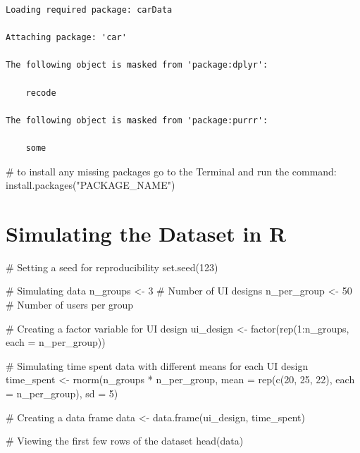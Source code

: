 \documentclass[
  letterpaper,
  DIV=11,
  numbers=noendperiod]{scrreprt}
\newenvironment{Shaded}{\begin{snugshade}}{\end{snugshade}}
\newcommand{\AttributeTok}[1]{\textcolor[rgb]{0.40,0.45,0.13}{#1}}
\newcommand{\CommentTok}[1]{\textcolor[rgb]{0.37,0.37,0.37}{#1}}
\newcommand{\DecValTok}[1]{\textcolor[rgb]{0.68,0.00,0.00}{#1}}
\newcommand{\FunctionTok}[1]{\textcolor[rgb]{0.28,0.35,0.67}{#1}}
\newcommand{\NormalTok}[1]{\textcolor[rgb]{0.00,0.23,0.31}{#1}}
\newcommand{\OtherTok}[1]{\textcolor[rgb]{0.00,0.23,0.31}{#1}}
\newcommand{\SpecialCharTok}[1]{\textcolor[rgb]{0.37,0.37,0.37}{#1}}
\begin{document}
\begin{verbatim}
Loading required package: carData

Attaching package: 'car'

The following object is masked from 'package:dplyr':

    recode

The following object is masked from 'package:purrr':

    some
\end{verbatim}

\begin{Shaded}
\begin{Highlighting}[]
\CommentTok{\# to install any missing packages go to the Terminal and run the command: install.packages("PACKAGE\_NAME")}
\end{Highlighting}
\end{Shaded}

\section{Simulating the Dataset in R}\label{simulating-the-dataset-in-r}

\begin{Shaded}
\begin{Highlighting}[]
\CommentTok{\# Setting a seed for reproducibility}
\FunctionTok{set.seed}\NormalTok{(}\DecValTok{123}\NormalTok{)}

\CommentTok{\# Simulating data}
\NormalTok{n\_groups }\OtherTok{\textless{}{-}} \DecValTok{3}  \CommentTok{\# Number of UI designs}
\NormalTok{n\_per\_group }\OtherTok{\textless{}{-}} \DecValTok{50}  \CommentTok{\# Number of users per group}

\CommentTok{\# Creating a factor variable for UI design}
\NormalTok{ui\_design }\OtherTok{\textless{}{-}} \FunctionTok{factor}\NormalTok{(}\FunctionTok{rep}\NormalTok{(}\DecValTok{1}\SpecialCharTok{:}\NormalTok{n\_groups, }\AttributeTok{each =}\NormalTok{ n\_per\_group))}

\CommentTok{\# Simulating time spent data with different means for each UI design}
\NormalTok{time\_spent }\OtherTok{\textless{}{-}} \FunctionTok{rnorm}\NormalTok{(n\_groups }\SpecialCharTok{*}\NormalTok{ n\_per\_group, }\AttributeTok{mean =} \FunctionTok{rep}\NormalTok{(}\FunctionTok{c}\NormalTok{(}\DecValTok{20}\NormalTok{, }\DecValTok{25}\NormalTok{, }\DecValTok{22}\NormalTok{), }\AttributeTok{each =}\NormalTok{ n\_per\_group), }\AttributeTok{sd =} \DecValTok{5}\NormalTok{)}

\CommentTok{\# Creating a data frame}
\NormalTok{data }\OtherTok{\textless{}{-}} \FunctionTok{data.frame}\NormalTok{(ui\_design, time\_spent)}

\CommentTok{\# Viewing the first few rows of the dataset}
\FunctionTok{head}\NormalTok{(data)}
\end{Highlighting}
\end{Shaded}
\end{document}
